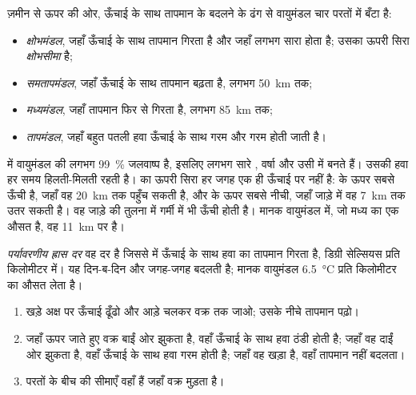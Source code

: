 \begin{definition}[वायुमंडल की परतें]\label{def:g8:the-atmosphere:layers}
ज़मीन से ऊपर की ओर, ऊँचाई के साथ तापमान के बदलने के ढंग से वायुमंडल चार परतों में
बँटा है:
\begin{itemize}
  \item \emph{क्षोभमंडल}, जहाँ ऊँचाई के साथ तापमान गिरता है और जहाँ
        लगभग सारा  होता है; उसका ऊपरी सिरा
        \emph{क्षोभसीमा} है;
  \item \emph{समतापमंडल}, जहाँ ऊँचाई के साथ तापमान बढ़ता है,
        लगभग \qty{50}{km} तक;
  \item \emph{मध्यमंडल}, जहाँ तापमान फिर से गिरता है, लगभग
        \qty{85}{km} तक;
  \item \emph{तापमंडल}, जहाँ बहुत पतली हवा ऊँचाई के साथ गरम और
        गरम होती जाती है।
\end{itemize}
\end{definition}

 में वायुमंडल की लगभग 99~\% जलवाष्प है, इसलिए लगभग सारे , वर्षा और 
उसी में बनते हैं। उसकी हवा हर समय हिलती-मिलती रहती है।  का ऊपरी सिरा हर
जगह एक ही ऊँचाई पर नहीं है:   के ऊपर सबसे ऊँची है, जहाँ वह
\qty{20}{km} तक पहुँच सकती है, और  के ऊपर सबसे नीची, जहाँ जाड़े में वह
\qty{7}{km} तक उतर सकती है। वह जाड़े की तुलना में गर्मी में भी ऊँची होती है। मानक
वायुमंडल में, जो मध्य  का एक औसत है, वह \qty{11}{km} पर
है।

\begin{definition}[पर्यावरणीय ह्रास दर]\label{def:g8:the-atmosphere:lapse-rate}
\emph{पर्यावरणीय ह्रास दर} वह दर है जिससे  में
ऊँचाई के साथ हवा का तापमान गिरता है, डिग्री सेल्सियस प्रति किलोमीटर में। यह दिन-ब-दिन
और जगह-जगह बदलती है; मानक वायुमंडल \qty{6.5}{\degreeCelsius} प्रति किलोमीटर का
औसत लेता
है।
\end{definition}

\begin{method}[तापमान का प्रोफ़ाइल पढ़ना]\label{met:g8:the-atmosphere:profile}
\begin{enumerate}
  \item खड़े अक्ष पर ऊँचाई ढूँढो और आड़े चलकर वक्र तक जाओ; उसके नीचे तापमान
        पढ़ो।
  \item जहाँ ऊपर जाते हुए वक्र बाईं ओर झुकता है, वहाँ ऊँचाई के साथ हवा ठंडी होती
        है; जहाँ वह दाईं ओर झुकता है, वहाँ ऊँचाई के साथ हवा गरम होती है; जहाँ वह
        खड़ा है, वहाँ तापमान नहीं बदलता।
  \item परतों के बीच की सीमाएँ वहाँ हैं जहाँ वक्र मुड़ता है।
\end{enumerate}
\end{method}

